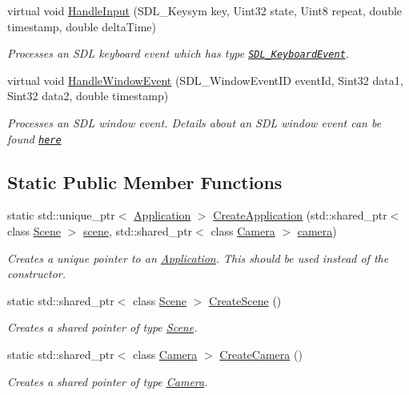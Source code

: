 \begin{DoxyCompactItemize}
virtual void \hyperlink{class_application_ae6074c3f102de1cb2fe4c81b545679db}{Handle\+Input} (S\+D\+L\+\_\+\+Keysym key, Uint32 state, Uint8 repeat, double timestamp, double delta\+Time)
\begin{DoxyCompactList}\small\item\em Processes an S\+D\+L keyboard event which has type \href{https://wiki.libsdl.org/SDL_KeyboardEvent}{\tt S\+D\+L\+\_\+\+Keyboard\+Event}. \end{DoxyCompactList}\item 
virtual void \hyperlink{class_application_a74d92db64e051efa56d0357989dcb755}{Handle\+Window\+Event} (S\+D\+L\+\_\+\+Window\+Event\+I\+D event\+Id, Sint32 data1, Sint32 data2, double timestamp)
\begin{DoxyCompactList}\small\item\em Processes an S\+D\+L window event. Details about an S\+D\+L window event can be found \href{https://wiki.libsdl.org/SDL_WindowEvent}{\tt here} \end{DoxyCompactList}\end{DoxyCompactItemize}
\subsection*{Static Public Member Functions}
\begin{DoxyCompactItemize}
\item 
static std\+::unique\+\_\+ptr$<$ \hyperlink{class_application}{Application} $>$ \hyperlink{class_application_a727f63f898a68bddf6d88309195ef194}{Create\+Application} (std\+::shared\+\_\+ptr$<$ class \hyperlink{class_scene}{Scene} $>$ \hyperlink{class_application_a88c6615107a5094bb93fa5f153f79554}{scene}, std\+::shared\+\_\+ptr$<$ class \hyperlink{class_camera}{Camera} $>$ \hyperlink{class_application_a0e8589fcb13c520ba472473abe5a518d}{camera})
\begin{DoxyCompactList}\small\item\em Creates a unique pointer to an \hyperlink{class_application}{Application}. This should be used instead of the constructor. \end{DoxyCompactList}\item 
static std\+::shared\+\_\+ptr$<$ class \hyperlink{class_scene}{Scene} $>$ \hyperlink{class_application_a511e638cf5748e10151f17d6140b9119}{Create\+Scene} ()
\begin{DoxyCompactList}\small\item\em Creates a shared pointer of type \hyperlink{class_scene}{Scene}. \end{DoxyCompactList}\item 
static std\+::shared\+\_\+ptr$<$ class \hyperlink{class_camera}{Camera} $>$ \hyperlink{class_application_a53c0a539fd2c4fe2cc48143cc0a3ea24}{Create\+Camera} ()
\begin{DoxyCompactList}\small\item\em Creates a shared pointer of type \hyperlink{class_camera}{Camera}. \end{DoxyCompactList}\end{DoxyCompactItemize}

